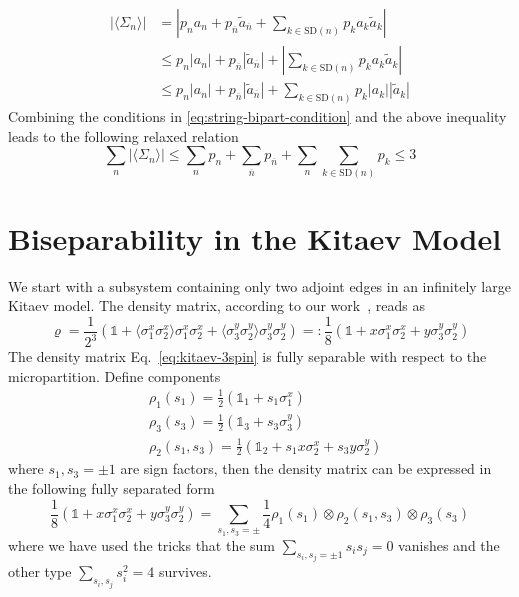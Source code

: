 \documentclass[12font]{article}
\numberwithin{equation}{section}    %
\theoremstyle{definition}
\newcommand{\anglelr}[1]{\langle #1 \rangle}
\newcommand{\lr}[1]{\left(  #1  \right)}
\newcommand{\abs}[1]{\left|  #1  \right|}
\newcommand{\mrm}[1]{\mathrm{#1}}
\begin{document}
\begin{align*}
    \abs{\anglelr{\Sigma_n}} 
    &= 
    \abs{
        p_na_n 
        + 
        p_{\overline{n}}\tilde{a}_{\overline{n}} 
        + 
        \sum_{k\in \mrm{SD}(n)}p_ka_k\tilde{a}_k
    } \\
    &\leq
    p_n\abs{a_n}
    +
    p_{\overline{n}}\abs{\tilde{a}_{\overline{n}} } 
    +
    \abs{
    \sum_{k\in \mrm{SD}(n)}p_ka_k\tilde{a}_k
    } \\
    &\leq 
    p_n\abs{a_n}
    +
    p_{\overline{n}}\abs{\tilde{a}_{\overline{n}} } 
    +
    \sum_{k\in \mrm{SD}(n)}p_k
    \abs{a_k}\abs{\tilde{a}_k} 
\end{align*}
Combining the conditions in \eqref{eq:string-bipart-condition} and the above inequality leads to the following relaxed relation
\begin{equation}\label{eq:string-bipart-relax-condition}
    \sum_{n}\abs{\anglelr{\Sigma_n}} \leq \sum_n p_n + \sum_{\overline{n}} p_{\overline{n}} + \sum_{n}\sum_{k\in\mrm{SD}(n)} p_k \leq 3
\end{equation}


\section{Biseparability in the Kitaev Model}
We start with a subsystem containing only two adjoint edges in an infinitely large Kitaev model. The density matrix, according to our work~\cite{wang2026exactorganizationdensitymatrices}, reads as
\begin{equation}\label{eq:kitaev-3spin}
    \varrho = \frac{1}{2^{3}}\lr{\mathds{1}+\anglelr{\sigma^x_1\sigma^x_2}\sigma^x_1\sigma^x_2 + \anglelr{\sigma^y_3\sigma^y_2}\sigma^y_3\sigma^y_2} 
    =: 
    \frac{1}{8}\lr{\mathds{1} + x\sigma^x_1\sigma^x_2 + y\sigma^y_3\sigma^y_2}
\end{equation}
The density matrix Eq.~\eqref{eq:kitaev-3spin} is fully separable with respect to the micropartition. Define components
\[
\begin{aligned}
    & \rho_1(s_1) = \frac{1}{2}\lr{\mathds{1}_1 + s_1 \sigma_1^x} \\
    & \rho_3(s_3) = \frac{1}{2}\lr{\mathds{1}_3 + s_3 \sigma_3^y} \\
    & \rho_2(s_1,s_3) = \frac{1}{2}\lr{\mathds{1}_2 + s_1 x \sigma_2^x + s_3 y \sigma_2^y} 
\end{aligned}
\]
where $s_1,s_3 = \pm1$ are sign factors, then the density matrix can be expressed in the following fully separated form
\begin{equation}\label{eq:kitaev-spin3-micropartition}
    \frac{1}{8}\lr{\mathds{1} + x\sigma^x_1\sigma^x_2 + y\sigma^y_3\sigma^y_2}
    =
    \sum_{s_1,s_3 = \pm}\frac{1}{4}\rho_1(s_1)\otimes \rho_2(s_1, s_3) \otimes \rho_3(s_3)
\end{equation}
where we have used the tricks that the sum $\sum_{s_i,s_j=\pm 1}s_is_j = 0$ vanishes and the other type $\sum_{s_i,s_j}s_i^2 = 4$ survives.
\end{document}
